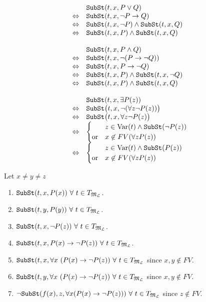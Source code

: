 \documentclass[11pt,a4paper]{article}
\begin{document}
\[\begin{array}{rl}
&\mathtt{SubSt}(t,x,P\vee Q)\\
\Leftrightarrow&\mathtt{SubSt}(t,x,\neg P\to Q)\\
\Leftrightarrow&\mathtt{SubSt}(t,x,\neg P)\wedge\mathtt{SubSt}(t,x,Q)\\
\Leftrightarrow&\mathtt{SubSt}(t,x,P)\wedge\mathtt{SubSt}(t,x,Q)\\\\
&\mathtt{SubSt}(t,x,P\wedge Q)\\
\Leftrightarrow&\mathtt{SubSt}(t,x,\neg(P\to\neg Q))\\
\Leftrightarrow&\mathtt{SubSt}(t,x,P\to\neg Q)\\
\Leftrightarrow&\mathtt{SubSt}(t,x,P)\wedge\mathtt{SubSt}(t,x,\neg Q)\\
\Leftrightarrow&\mathtt{SubSt}(t,x,P)\wedge\mathtt{SubSt}(t,x,Q)\\\\
&\mathtt{SubSt}(t,x,\exists P(z))\\
\Leftrightarrow&\mathtt{SubSt}\big(t,x,\neg(\forall z\neg P(z))\big)\\
\Leftrightarrow&\mathtt{SubSt}\big(t,x,\forall z\neg P(z)\big)\\
\Leftrightarrow&\begin{cases}&z\in\mathrm{Var}(t)\wedge\mathtt{SubSt}(\neg P(z))\\\text{or}&x\not\in FV(\forall z P(z))\end{cases}\\
\Leftrightarrow&\begin{cases}&z\in\mathrm{Var}(t)\wedge\mathtt{SubSt}(P(z))\\\text{or}&x\not\in FV(\forall z P(z))\end{cases}
\end{array}\]

Let $x\neq y\neq z$
\begin{enumerate}
	\item $\mathtt{SubSt}(t,x,P(x))\ \forall\ t\in T_{\M_\LL}$.
	\item $\mathtt{SubSt}(t,y,P(y))\ \forall\ t\in T_{\M_\LL}$.
	\item $\mathtt{SubSt}(t,x,\neg P(z))\ \forall\ t\in T_{\M_\LL}$.
	\item $\mathtt{SubSt}(t,x,P(x)\to\neg P(z))\ \forall\ t\in T_{\M_\LL}$.
	\item $\mathtt{SubSt}(t,x,\forall x\ (P(x)\to\neg P(z))\ \forall\ t\in T_{\M_\LL}$ since $x,y\not\in FV$.
	\item $\mathtt{SubSt}(t,y,\forall x\ (P(x)\to\neg P(z))\ \forall\ t\in T_{\M_\LL}$ since $x,y\not\in FV$.
	\item $\neg\mathtt{SubSt}(f(x),z,\forall x(P(x)\to\neg P(z)))\ \forall\ t\in T_{\mathfrak{M}_{\mathcal{L}}}$ since $z\not\in FV$.
\end{enumerate}
\end{document}
